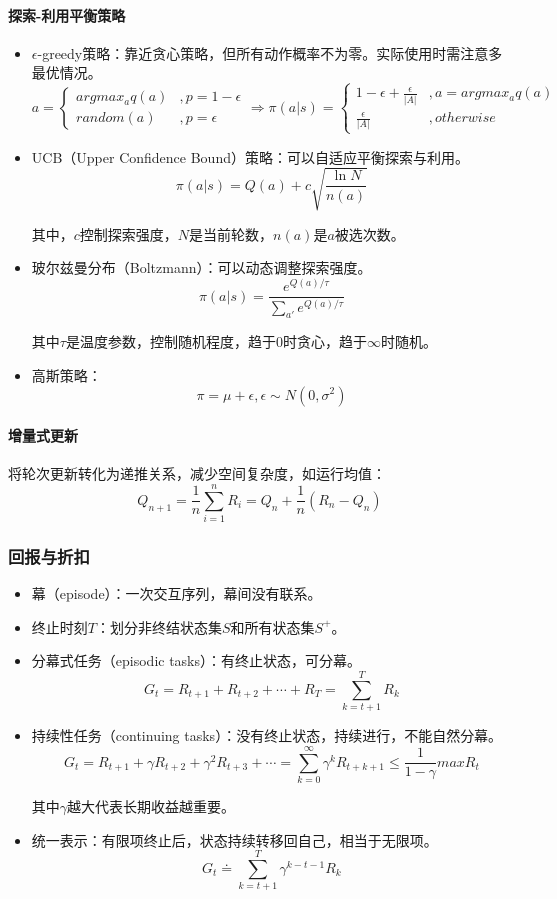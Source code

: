 \documentclass[
12pt, %
a4paper, 
oneside, %
headinclude,footinclude, %
]{scrartcl}
\begin{document}
\paragraph{探索-利用平衡策略}
\begin{itemize}
\item $ \epsilon $-greedy策略：靠近贪心策略，但所有动作概率不为零。实际使用时需注意多最优情况。
$$
a = 
\begin{cases} 
argmax_a q(a) &, p = 1 - \epsilon \\
random(a) &, p = \epsilon
\end{cases}
\Rightarrow 
\pi(a|s) = 
\begin{cases} 
1 - \epsilon + \frac{\epsilon}{|A|} &, a = argmax_a q(a) \\
\frac{\epsilon}{|A|} &, otherwise
\end{cases}
$$
\item UCB（Upper Confidence Bound）策略：可以自适应平衡探索与利用。
$$ \pi(a|s) = Q(a) + c\sqrt{\frac{\ln N}{n(a)}} $$

其中，$ c $控制探索强度，$ N $是当前轮数，$ n(a) $是$ a $被选次数。
\item 玻尔兹曼分布（Boltzmann）：可以动态调整探索强度。
$$ \pi(a|s) = \frac{e^{Q(a)/\tau}}{\sum_{a'} e^{Q(a)/\tau}} $$

其中$ \tau $是温度参数，控制随机程度，趋于$ 0 $时贪心，趋于$ \infty $时随机。
\item 高斯策略：
$$ \pi = \mu + \epsilon, \epsilon \sim N(0, \sigma^2) $$
\end{itemize}
\paragraph{增量式更新}
将轮次更新转化为递推关系，减少空间复杂度，如运行均值：
$$ Q_{n + 1} = \frac{1}{n}\sum_{i = 1}^n R_i = Q_n + \frac{1}{n}(R_n - Q_n) $$
\subsubsection[回报与折扣]{回报与折扣}
\begin{itemize}
\item 幕（episode）：一次交互序列，幕间没有联系。
\item 终止时刻$ T $：划分非终结状态集$ S $和所有状态集$ S^+ $。
\item 分幕式任务（episodic tasks）：有终止状态，可分幕。
$$ G_t = R_{t + 1} + R_{t + 2} + \cdots + R_T = \sum_{k = t + 1}^T R_k $$
\item 持续性任务（continuing tasks）：没有终止状态，持续进行，不能自然分幕。
$$ G_t = R_{t + 1} + \gamma R_{t + 2} + \gamma^2 R_{t + 3} + \cdots = \sum_{k = 0}^{\infty} \gamma^k R_{t + k + 1} \leq \frac{1}{1 - \gamma} max R_t $$

其中$ \gamma $越大代表长期收益越重要。
\item 统一表示：有限项终止后，状态持续转移回自己，相当于无限项。
$$ G_t \doteq \sum_{k = t + 1}^{T} \gamma^{k - t - 1} R_k $$
\end{itemize}
\end{document}
